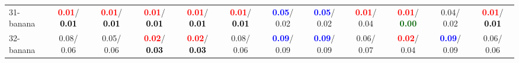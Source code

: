 \begin{table}[h]
\begin{center}
{\begin{tabular}{lc|c|c|c|c|c|c|c|c|c|c}
31-banana & \textcolor{red}{\textbf{  0.01}}/\textcolor{black}{\textbf{  0.01}} & \textcolor{red}{\textbf{  0.01}}/\textcolor{black}{\textbf{  0.01}} & \textcolor{red}{\textbf{  0.01}}/\textcolor{black}{\textbf{  0.01}} & \textcolor{red}{\textbf{  0.01}}/\textcolor{black}{\textbf{  0.01}} & \textcolor{red}{\textbf{  0.01}}/\textcolor{black}{\textbf{  0.01}} & \textcolor{blue}{\textbf{  0.05}}/  0.02 & \textcolor{blue}{\textbf{  0.05}}/  0.02 & \textcolor{red}{\textbf{  0.01}}/  0.04 & \textcolor{red}{\textbf{  0.01}}/\textcolor{darkgreen}{\textbf{  0.00}} &   0.04/  0.02 & \textcolor{red}{\textbf{  0.01}}/\textcolor{black}{\textbf{  0.01}} \\
32-banana &   0.08/  0.06 &   0.05/  0.06 & \textcolor{red}{\textbf{  0.02}}/\textcolor{black}{\textbf{  0.03}} & \textcolor{red}{\textbf{  0.02}}/\textcolor{black}{\textbf{  0.03}} &   0.08/  0.06 & \textcolor{blue}{\textbf{  0.09}}/  0.09 & \textcolor{blue}{\textbf{  0.09}}/  0.09 &   0.06/  0.07 & \textcolor{red}{\textbf{  0.02}}/  0.04 & \textcolor{blue}{\textbf{  0.09}}/  0.09 &   0.06/  0.06 \\\end{tabular}}\label{stratsALCKappa0Allalla}
\end{center}
\end{table}
